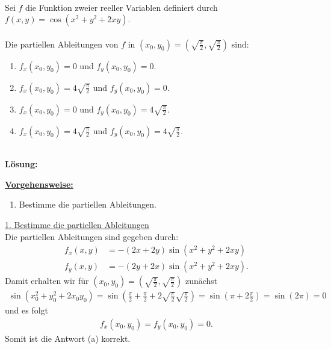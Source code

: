 \newpage

\subsection*{}
Sei $f$ die Funktion zweier reeller Variablen definiert durch $f(x,y) = \cos(x^2 +y^2 + 2xy).$\\
\\
Die partiellen Ableitungen von $f$ in $(x_0, y_0) = \left(\sqrt{\frac{\pi}{2}}, \sqrt{\frac{\pi}{2}}\right)$ sind:
\renewcommand{\labelenumi}{(\alph{enumi})}
\begin{enumerate}
	\item 
	$f_x(x_0,y_0) = 0$ und $f_y(x_0,y_0) = 0$.
	\item
	$f_x(x_0,y_0) = 4 \sqrt{\frac{\pi}{2}} $ und $f_y(x_0,y_0) = 0$.
	\item
	$f_x(x_0,y_0) = 0 $ und $f_y(x_0,y_0) = 4 \sqrt{\frac{\pi}{2}}$.
	\item
	$f_x(x_0,y_0) = 4 \sqrt{\frac{\pi}{2}} $ und $f_y(x_0,y_0) = 4 \sqrt{\frac{\pi}{2}}$.
\end{enumerate}
\ \\
\textbf{Lösung:}
\begin{mdframed}
\underline{\textbf{Vorgehensweise:}}
\renewcommand{\labelenumi}{\theenumi.}
\begin{enumerate}
\item Bestimme die partiellen Ableitungen.
\end{enumerate}
\end{mdframed}

\underline{1. Bestimme die partiellen Ableitungen}\\
Die partiellen Ableitungen sind gegeben durch:
\begin{align*}
	f_x(x,y)
	&=
	-(2x + 2y) \sin(x^2 +y^2 +2xy) 
	\\
	f_y(x,y)
	&=
	-(2y + 2x) \sin(x^2 +y^2 +2xy).
\end{align*}
Damit erhalten wir für $(x_0, y_0) = \left(\sqrt{\frac{\pi}{2}}, \sqrt{\frac{\pi}{2}}\right)$ zunächst
\begin{align*}
	\sin(x_0^2 + y_0^2 + 2 x_0 y_0)
	=
	\sin\left(\frac{\pi}{2} + \frac{\pi}{2} +2 \sqrt{\frac{\pi}{2}} \sqrt{\frac{\pi}{2}} \right)
	=
	\sin\left(\pi +2 \frac{\pi}{2} \right)
	= 
	\sin(2 \pi ) = 0
\end{align*}
und es folgt
\begin{align*}
	f_x(x_0,y_0) = f_y(x_0,y_0) = 0.
\end{align*}
Somit ist die Antwort (a) korrekt.


